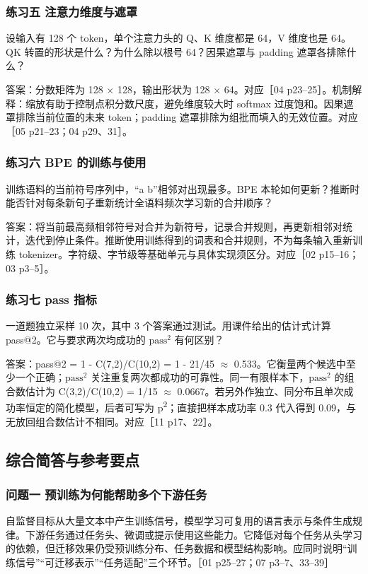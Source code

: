 \documentclass[UTF8,a4paper,zihao=-4,fontset=windows]{ctexart}
\begin{document}
\subsubsection*{练习五 注意力维度与遮罩}
设输入有 128 个 token，单个注意力头的 Q、K 维度都是 64，V 维度也是 64。QK 转置的形状是什么？为什么除以根号 64？因果遮罩与 padding 遮罩各排除什么？

答案：分数矩阵为 128 \ensuremath{\times} 128，输出形状为 128 \ensuremath{\times} 64。对应［04 p23--25］。机制解释：缩放有助于控制点积分数尺度，避免维度较大时 softmax 过度饱和。因果遮罩排除当前位置的未来 token；padding 遮罩排除为组批而填入的无效位置。对应［05 p21--23；04 p29、31］。

\subsubsection*{练习六 BPE 的训练与使用}
训练语料的当前符号序列中，“a b”相邻对出现最多。BPE 本轮如何更新？推断时能否针对每条新句子重新统计全语料频次学习新的合并顺序？

答案：将当前最高频相邻符号对合并为新符号，记录合并规则，再更新相邻对统计，迭代到停止条件。推断使用训练得到的词表和合并规则，不为每条输入重新训练 tokenizer。字符级、字节级等基础单元与具体实现须区分。对应［02 p15--16；03 p3--5］。

\subsubsection*{练习七 pass 指标}
一道题独立采样 10 次，其中 3 个答案通过测试。用课件给出的估计式计算 pass@2。它与要求两次均成功的 $\mathrm{pass}^{2}$ 有何区别？

答案：pass@2 = 1 - C(7,2)/\allowbreak{}C(10,2) = 1 - 21/\allowbreak{}45 \ensuremath{\approx} 0.533。它衡量两个候选中至少一个正确；$\mathrm{pass}^{2}$ 关注重复两次都成功的可靠性。同一有限样本下，$\mathrm{pass}^{2}$ 的组合数估计为 C(3,2)/\allowbreak{}C(10,2) = 1/\allowbreak{}15 \ensuremath{\approx} 0.0667。若另外作独立、同分布且单次成功率恒定的简化模型，后者可写为 p\textsuperscript{2}；直接把样本成功率 0.3 代入得到 0.09，与无放回组合数估计不相同。对应［11 p17、22］。

\subsection*{综合简答与参考要点}
\subsubsection*{问题一 预训练为何能帮助多个下游任务}
自监督目标从大量文本中产生训练信号，模型学习可复用的语言表示与条件生成规律。下游任务通过任务头、微调或提示使用这些能力。它降低对每个任务从头学习的依赖，但迁移效果仍受预训练分布、任务数据和模型结构影响。应同时说明“训练信号”“可迁移表示”“任务适配”三个环节。［01 p25--27；07 p3--7、33--39］
\end{document}

